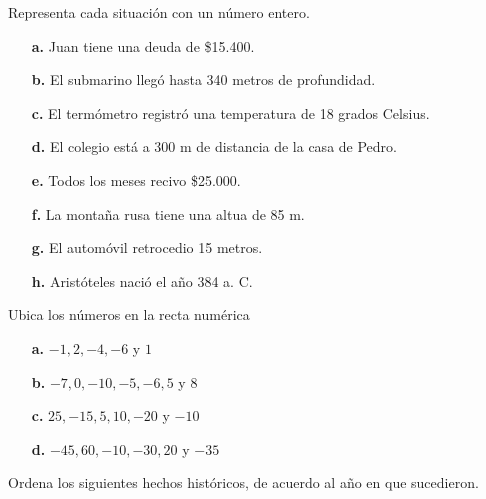 \documentclass[spanish,letterpaper, 11pt, addpoints, answers]{exam}
\begin{document}
\begin{questions}
  \question Representa cada situación con un número entero.
  
  \begin{itemize}
    \item[\textbf{a.}]Juan tiene una deuda de \$15.400.
    \item[\textbf{b.}]El submarino llegó hasta 340 metros de profundidad.
    \item[\textbf{c.}]El termómetro registró una temperatura de 18 grados Celsius.
    \item[\textbf{d.}]El colegio está a 300 m de distancia de la casa de Pedro.
    \item[\textbf{e.}]Todos los meses recivo \$25.000.
    \item[\textbf{f.}]La montaña rusa tiene una altua de 85 m.
    \item[\textbf{g.}]El automóvil retrocedio 15 metros.
    \item[\textbf{h.}]Aristóteles nació el año 384 a. C. 
    \end{itemize}

  \question Ubica los números en la recta numérica

  \begin{itemize}
  \item[\textbf{a.}]$-1,2,-4,-6$ y $1$
  \item[\textbf{b.}]$-7,0,-10,-5,-6,5$ y $8$
  \item[\textbf{c.}]$25,-15,5,10,-20$ y $-10$
  \item[\textbf{d.}]$-45,60,-10,-30,20$ y $-35$
  \end{itemize}
  
  \question Ordena los siguientes hechos históricos, de acuerdo al año en que sucedieron.
  

\end{questions}
\end{document}
